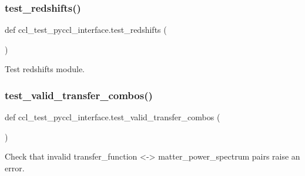 \subsubsection{\texorpdfstring{test\+\_\+redshifts()}{test\_redshifts()}}
{\footnotesize\ttfamily def ccl\+\_\+test\+\_\+pyccl\+\_\+interface.\+test\+\_\+redshifts (\begin{DoxyParamCaption}{ }\end{DoxyParamCaption})}

\begin{DoxyVerb}Test redshifts module.
\end{DoxyVerb}
 \mbox{\label{namespaceccl__test__pyccl__interface_a64e29dd68981ffe884100ab216146869}} 
\subsubsection{\texorpdfstring{test\+\_\+valid\+\_\+transfer\+\_\+combos()}{test\_valid\_transfer\_combos()}}
{\footnotesize\ttfamily def ccl\+\_\+test\+\_\+pyccl\+\_\+interface.\+test\+\_\+valid\+\_\+transfer\+\_\+combos (\begin{DoxyParamCaption}{ }\end{DoxyParamCaption})}

\begin{DoxyVerb}Check that invalid transfer_function <-> matter_power_spectrum pairs raise
an error.
\end{DoxyVerb}
 